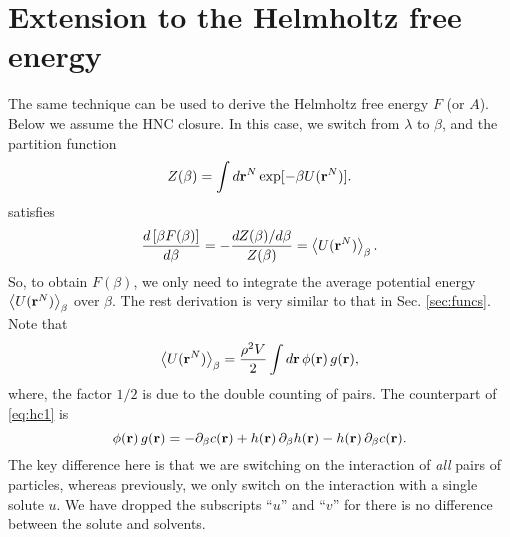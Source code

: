 \documentclass[12pt]{article}
\begin{document}

\section{Extension to the Helmholtz free energy}

The same technique can be used to derive the Helmholtz free energy $F$ (or $A$).
%
Below we assume the HNC closure.
%
In this case, we switch from $\lambda$ to $\beta$,
and the partition function
%
\begin{equation}
  Z(\beta) = \int d\mathbf{r}^N \exp[-\beta U(\mathbf{r}^N)].
  \label{eq:partfunc_beta}
\end{equation}
%
satisfies
\begin{align*}
  \frac{ d \left[ \beta F(\beta) \right] }
  { d \beta }
  = -\frac{ d Z(\beta) / d \beta }{Z(\beta)}
  = \left\langle
      U(\mathbf{r}^N)
    \right\rangle_\beta.
\end{align*}
%
So, to obtain $F(\beta)$, we only need to integrate
  the average potential energy
  $\left\langle U(\mathbf{r}^N) \right\rangle_\beta$
  over $\beta$.
%
The rest derivation is very similar to that in Sec. \ref{sec:funcs}.
%
Note that
%
\begin{equation}
  \left\langle
    U(\mathbf{r}^N)
  \right\rangle_\beta
  =
  \frac{\rho^2 V}{2} \int d \mathbf{r} \, \phi(\mathbf{r}) \, g(\mathbf{r}),
\end{equation}
%
where, the factor $1/2$ is due to the double counting of pairs.
%
The counterpart of \eqref{eq:hc1} is
%
\begin{equation}
  \phi(\mathbf{r}) \, g(\mathbf{r})
  =
  - \partial_\beta c(\mathbf{r}) + h(\mathbf{r}) \, \partial_\beta h(\mathbf{r}) - h(\mathbf{r}) \, \partial_\beta c(\mathbf{r}).
  \label{eq:hcall}
\end{equation}
%
The key difference here is that we are switching on the interaction
  of \emph{all} pairs of particles, whereas previously, we only switch on
  the interaction with a single solute $u$.
%
We have dropped the subscripts ``$u$'' and ``$v$''
  for there is no difference between the solute and solvents.
\end{document}
